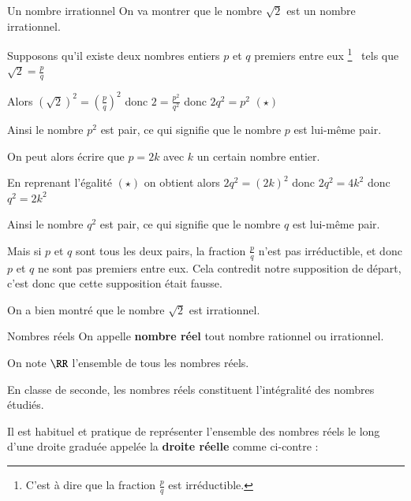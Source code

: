 \documentclass[oneside,12pt]{article}          %
\begin{document}
\begin{exemple}{Un nombre irrationnel}
	\renewcommand{\thempfootnote}{\arabic{mpfootnote}}
	On va montrer que le nombre $\sqrt{2}$ est un nombre irrationnel.

	Supposons qu'il existe deux nombres entiers $p$ et $q$ premiers entre eux
	\footnote{C'est à dire que la fraction $\frac{p}{q}$ est irréductible.}
	~tels que $\sqrt{2}=\frac{p}{q}$

	Alors $\left(\sqrt{2}\right)^2=\left(\frac{p}{q}\right)^2$ donc $2=\frac{p^2}{q^2}$ donc $2q^2=p^2$ \quad $(\star)$ 

	Ainsi le nombre $p^2$ est pair, ce qui signifie que le nombre $p$ est lui-même pair.

	On peut alors écrire que $p=2k$ avec $k$ un certain nombre entier.

	En reprenant l'égalité $(\star)$ on obtient alors $2q^2=(2k)^2$ donc $2q^2=4k^2$ donc $q^2=2k^2$

	Ainsi le nombre $q^2$ est pair, ce qui signifie que le nombre $q$ est lui-même pair.

	Mais si $p$ et $q$ sont tous les deux pairs, la fraction $\frac{p}{q}$ n'est pas irréductible, et donc $p$ et $q$ ne sont pas premiers entre eux. Cela contredit notre supposition de départ, c'est donc que cette supposition était fausse.

	On a bien montré que le nombre $\sqrt{2}$ est irrationnel.
\end{exemple}


\begin{definition}{Nombres réels}
    On appelle \textbf{nombre réel} tout nombre rationnel ou irrationnel.
    
    On note $\RR$ l'ensemble de tous les nombres réels.
\end{definition}


\begin{remarque}
    	En classe de seconde, les nombres réels constituent l'intégralité des nombres étudiés.
\end{remarque}



Il est habituel et pratique de représenter l'ensemble des nombres réels le long d'une droite graduée appelée la \textbf{droite réelle} comme ci-contre : 
\end{document}
